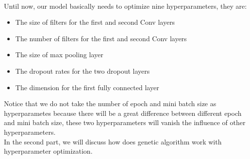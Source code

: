 \documentclass[12pt]{article}
\begin{document}
~\\
Until now, our model basically needs to optimize nine hyperparameters, they are:
\begin{itemize}
\item The size of filters for the first and second Conv layers
\item The number of filters for the first and second Conv layers
\item The size of max pooling layer
\item The dropout rates for the two dropout layers
\item The dimension for the first fully connected layer
\end{itemize}
Notice that we do not take the number of epoch and mini batch size as  hyperparametes because there will be a great difference between different epoch and mini batch size, these two hyperparameters will vanish the influence of other hyperparameters. \\
In the second part, we will discuss how does genetic algorithm work with hyperparameter optimization.\\
\end{document}
